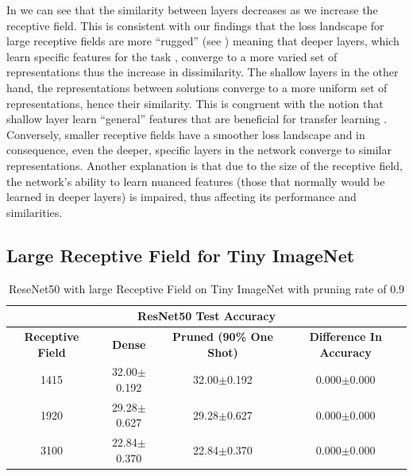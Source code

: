 In  we can see that the similarity between layers decreases as we increase the receptive
field. This is consistent with our findings that the loss landscape for large receptive fields are more ``rugged''
(see )
meaning that deeper layers, which learn specific features for the task \citep{yosinskiHowTransferableAre2014, roAutoLRLayerwisePruning2021}, converge to a more varied set of representations thus the
increase in dissimilarity. The shallow layers in the other hand, the representations between solutions converge to a
more uniform set of representations, hence their similarity. This is congruent with the notion that shallow layer
learn ``general'' features that are beneficial for transfer learning \citep{roAutoLRLayerwisePruning2021}.
Conversely, smaller receptive fields have a smoother loss landscape and in consequence, even the deeper, specific layers
in the network converge to similar representations. Another explanation is that due to the size of the receptive
field, the network's ability to learn nuanced features (those that normally would be learned in deeper layers) is
impaired, thus affecting its performance and similarities.

\subsection{Large Receptive Field for Tiny ImageNet}
\label{subsec:LargeRFTI}
\begin{table}[H]
  \centering
\begin{tabular}{@{}cccc@{}}\toprule
\multicolumn{4}{c}{\textbf{ResNet50 Test Accuracy}}                                            \\ \midrule
\textbf{Receptive Field} & \textbf{Dense}  & \textbf{Pruned (90\% One Shot)} & \textbf{Difference In Accuracy} \\ \midrule
1415                     & 32.00$\pm$0.192 & 32.00$\pm$0.192 & 0.000$\pm$0.000                 \\
1920                     & 29.28$\pm$0.627 & 29.28$\pm$0.627 & 0.000$\pm$0.000                 \\
3100                     & 22.84$\pm$0.370 & 22.84$\pm$0.370 & 0.000$\pm$0.000                 \\ \bottomrule
\end{tabular}
\caption{ReseNet50 with large Receptive Field on Tiny ImageNet  with pruning rate of 0.9}
\label{tab:tiny imagenet largeRF one shot pruning rate 09}
\end{table}

